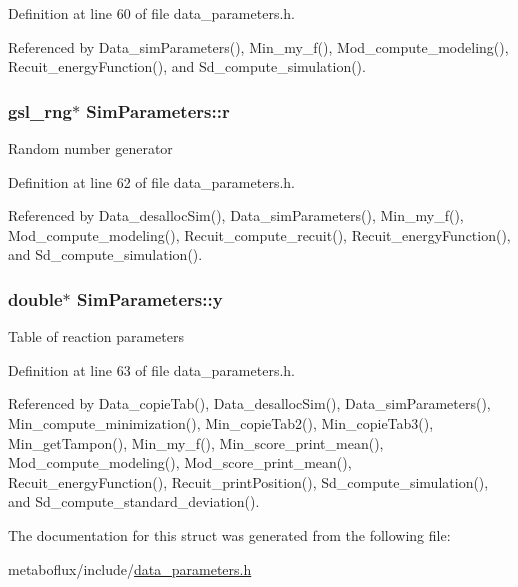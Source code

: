 Definition at line 60 of file data\_\-parameters.h.



Referenced by Data\_\-simParameters(), Min\_\-my\_\-f(), Mod\_\-compute\_\-modeling(), Recuit\_\-energyFunction(), and Sd\_\-compute\_\-simulation().

\hypertarget{structSimParameters_a3657bf540ffac966ca5e6e48595370ac}{
\subsubsection[{r}]{\setlength{\rightskip}{0pt plus 5cm}gsl\_\-rng$\ast$ {\bf SimParameters::r}}}
\label{structSimParameters_a3657bf540ffac966ca5e6e48595370ac}
Random number generator 

Definition at line 62 of file data\_\-parameters.h.



Referenced by Data\_\-desallocSim(), Data\_\-simParameters(), Min\_\-my\_\-f(), Mod\_\-compute\_\-modeling(), Recuit\_\-compute\_\-recuit(), Recuit\_\-energyFunction(), and Sd\_\-compute\_\-simulation().

\hypertarget{structSimParameters_aba46fa332475a2c74856712fa0ca10a0}{
\subsubsection[{y}]{\setlength{\rightskip}{0pt plus 5cm}double$\ast$ {\bf SimParameters::y}}}
\label{structSimParameters_aba46fa332475a2c74856712fa0ca10a0}
Table of reaction parameters 

Definition at line 63 of file data\_\-parameters.h.



Referenced by Data\_\-copieTab(), Data\_\-desallocSim(), Data\_\-simParameters(), Min\_\-compute\_\-minimization(), Min\_\-copieTab2(), Min\_\-copieTab3(), Min\_\-getTampon(), Min\_\-my\_\-f(), Min\_\-score\_\-print\_\-mean(), Mod\_\-compute\_\-modeling(), Mod\_\-score\_\-print\_\-mean(), Recuit\_\-energyFunction(), Recuit\_\-printPosition(), Sd\_\-compute\_\-simulation(), and Sd\_\-compute\_\-standard\_\-deviation().



The documentation for this struct was generated from the following file:\begin{DoxyCompactItemize}
\item 
metaboflux/include/\hyperlink{data__parameters_8h}{data\_\-parameters.h}\end{DoxyCompactItemize}
